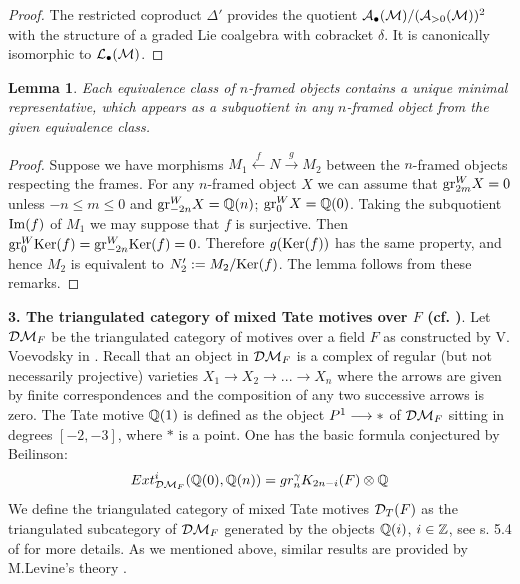 \documentclass[10pt]{article}
\newtheorem{lemma}[theorem]{Lemma}
\begin{document}
\begin{proof}
The restricted coproduct
$\Delta'$  provides the quotient 
$
{\cal A}_{\bullet}({\cal M})/({\cal A}_{>0}({\cal M}) )^2
$ 
with the structure of a graded Lie coalgebra  with cobracket 
$\delta$. It is canonically isomorphic to ${\cal L}_{\bullet}({\cal M})$. 
 

\end{proof}

\begin{lemma} \label{2.3.01.2}
Each equivalence class of $n$-framed objects contains a unique 
minimal representative, which appears as a subquotient in any 
$n$-framed object from the given equivalence class. 
\end{lemma}

\begin{proof} Suppose we have morphisms $M_1 \stackrel{f}{\longleftarrow} N 
\stackrel{g}{\longrightarrow} M_2$ between the $n$-framed objects respecting the frames. For any $n$-framed object $X$ we can assume that ${\rm gr}^W_{2m}X =0$ unless $ -n \leq m \leq 0$ and 
${\rm gr}^W_{-2n}X = {\mathbb Q}(n)$; ${\rm gr}^W_{0}X = {\mathbb Q}(0)$. Taking the subquotient ${\rm Im}(f)$ 
of $M_1$ we may suppose that $f$ is surjective. Then ${\rm gr}^W_{0}{\rm Ker}(f) = 
{\rm gr}^W_{-2n}{\rm Ker}(f) = 0$. Therefore $g({\rm Ker}(f))$ has the same property, and hence $M_2$ is equivalent to $N_2':= M_2/{\rm Ker}(f)$. The lemma follows from these remarks. 


\end{proof}

{\bf 3. The triangulated category of mixed Tate motives over $F$ (cf. \cite{V})}. 
Let ${\cal D}{\cal M}_F$ be  the triangulated category  of 
 motives over a field $F$ as constructed by V. Voevodsky in   \cite{V}.  
Recall that an object in ${\cal D}{\cal M}_F$
is a complex of regular (but not necessarily projective) varieties $X_1
\longrightarrow X_2 
\longrightarrow ... \longrightarrow X_n$ where the arrows are given by
finite 
correspondences and the composition of any two successive arrows is
zero. 
The Tate motive ${\mathbb Q}(1)$ is defined as the object $P^1 \longrightarrow \ast$ of ${\cal D}{\cal M}_F$
 sitting in degrees $[-2,-3]$, where $\ast$ is a point. 
One has the  basic  formula conjectured by Beilinson: 
\begin{equation} \label{vvvvv}
Ext^i_{{\cal D}{\cal M}_F}({\mathbb Q}(0), {\mathbb Q}(n)) = 
gr^{\gamma}_nK_{2n-i}(F)\otimes {\mathbb Q} 
\end{equation} 
We define the triangulated category of mixed 
Tate motives ${\cal D}_T(F)$ as 
the triangulated subcategory of ${\cal D}{\cal M}_F$ generated by the objects ${\mathbb Q}(i)$, 
$i \in {\mathbb Z}$, see s. 5.4 of \cite{G8} for more details. As we mentioned above, similar results are 
provided by M.Levine's theory \cite{L}. 
\end{document}
